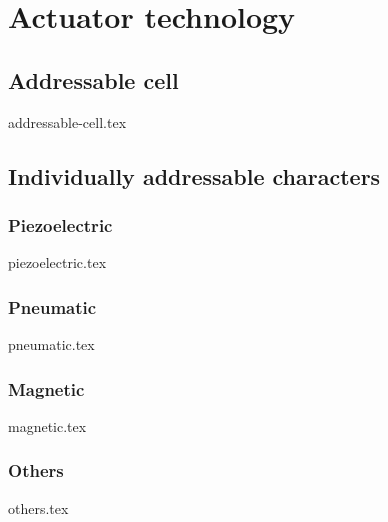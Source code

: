 \section{Actuator technology}
    \subsection{Addressable cell}
        {addressable-cell.tex}
    \subsection{Individually addressable characters}
        \subsubsection{Piezoelectric}
        {piezoelectric.tex}
        
        \subsubsection{Pneumatic}
        {pneumatic.tex}

        \subsubsection{Magnetic}
        {magnetic.tex}

        \subsubsection{Others}
        {others.tex}